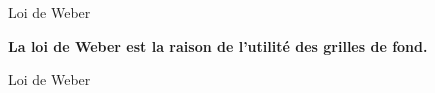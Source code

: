 \documentclass[french]{beamer}
\begin{document}
\begin{frame}{Loi de Weber}
\begin{center}\begin{Huge}\textbf{
			La loi de Weber est la raison de l'utilité des grilles de fond.
}\end{Huge}\end{center}
\end{frame}

\begin{frame}{Loi de Weber}
\begin{center}
	\begin{minipage}{.49\textwidth}
		\begin{center}
		\end{center}
	\end{minipage}
	\hfill
	\begin{minipage}{.49\textwidth}
		\begin{center}

\end{center}
\end{minipage}
\end{center}
\end{frame}
\end{document}
